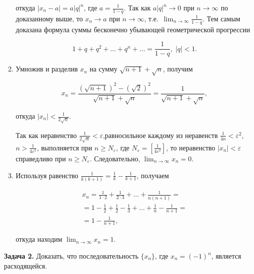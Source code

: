\begin{enumerate}
\noindent
откуда $|x_{n} - a| = a|q|^{n}$, где $\displaystyle a = \frac{1}{1 - q}$.
Так как $a|q|^{n} \to 0$ при $n \to \infty$ по доказанному выше,
то $x_{n} \to a$ при $n \to \infty$,
т.е.\ $\displaystyle \lim_{n \to \infty} \frac{1}{1 - q}$.
Тем самым доказана формула суммы бесконечно убывающей геометрической прогрессии

\begin{equation*}
\displaystyle 1 + q + q^{2} + \dots + q^{n} + \dots = \frac{1}{1 - q}, \;
|q| < 1.
\end{equation*}

\item Умножив и разделив $x_{n}$ на сумму $\sqrt{n + 1} + \sqrt{n}$,
получим

\begin{equation*}
\displaystyle x_{n} =
\frac{\left( \sqrt{n+1} \right)^{2}- \left( \sqrt{2} \right)^{2}}{\sqrt{n+1} + \sqrt{n}} =
\frac{1}{\sqrt{n+1} + \sqrt{n}},
\end{equation*}

\noindent
откуда $\displaystyle |x_{n}| < \frac{1}{2\sqrt{n}}$.

Так как неравенство $\displaystyle \frac{1}{2\sqrt{n}} < \varepsilon$,равносильное
каждому из неравенств
$\displaystyle \frac{1}{4n} < \varepsilon^{2}$, 
$\displaystyle n > \frac{1}{4\varepsilon^{2}}$,
выполняется при $n \geqslant N_{\varepsilon}$,
где $\displaystyle N_{\varepsilon} = \left[ \frac{1}{4\varepsilon^{2}} \right]$,
то неравенство $|x_{n}| < \varepsilon$ справедливо при $n \geqslant N_{\varepsilon}$.
Следовательно, $\displaystyle \lim_{n \to \infty} x_{n} = 0$.

\item Используя равенство
$\displaystyle \frac{1}{k(k+1)} = \frac{1}{k} - \frac{1}{k+1}$,
получаем

\begin{multline*}
\displaystyle
x_{n} =
\frac{1}{1 \cdot 2} + \frac{1}{2 \cdot 3} + \dots + \frac{1}{n(n+1)} = \\
= 1 - \frac{1}{2} + \frac{1}{2} - \frac{1}{3} + \dots + \frac{1}{n} - \frac{1}{n+1} = \\
= 1 - \frac{1}{n+1},
\end{multline*}

\noindent
откуда находим $\displaystyle \lim_{n \to \infty} x_{n} = 1$.

\end{enumerate}

\textbf{Задача 2.}\label{ex:3_1_2}
Доказать, что последовательность $\{x_{n}\}$, где $x_{n} = (-1)^{n}$, является расходящейся.

